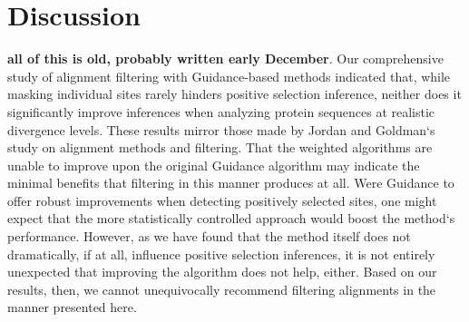 \documentclass[12pt]{article}
\begin{document}
























\section*{Discussion}

\textbf{all of this is old, probably written early December}.
Our comprehensive study of alignment filtering with Guidance-based methods indicated that, while masking individual sites rarely hinders positive selection inference, neither does it significantly improve inferences when analyzing protein sequences at realistic divergence levels. These results mirror those made by Jordan and Goldman`s \citep{Jordan2011} study on alignment methods and filtering. That the weighted algorithms are unable to improve upon the original Guidance algorithm may indicate the minimal benefits that filtering in this manner produces at all. Were Guidance to offer robust improvements when detecting positively selected sites, one might expect that the more statistically controlled approach would boost the method`s performance. However, as we have found that the method itself does not dramatically, if at all, influence positive selection inferences, it is not entirely unexpected that improving the algorithm does not help, either. Based on our results, then, we cannot unequivocally recommend filtering alignments in the manner presented here. 
\end{document}
